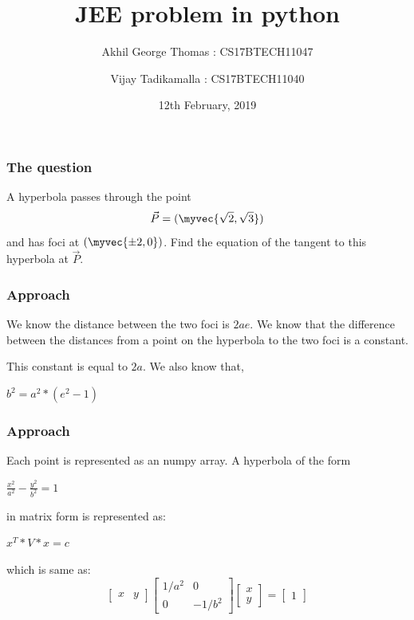 \documentclass{beamer}
\title{JEE problem in python}
\author{}{}
\author{
  Akhil George Thomas : CS17BTECH11047
  \and \newline
  Vijay Tadikamalla : CS17BTECH11040
}
\institute{IITH}
\date{12th February, 2019}
\begin{document}
 
\frame{\titlepage}
\begin{frame}
\frametitle{The question}
A hyperbola passes through the point 
\begin{equation}
\vec{P}=(\myvec{\sqrt{2}, \sqrt{3}})
\end{equation}
and has foci at $(\myvec{\pm 2, 0})$.  Find the equation of the tangent to this hyperbola at 
$\vec{P}$.
\end{frame}

\begin{frame}
\frametitle{Approach}
We know the distance between the two foci is $2ae$.
\pause
\bigbreak
We know that the difference between the distances from a point on the hyperbola to the two foci is a constant.
\pause
\bigbreak

This constant is equal to $2a$.
\pause
\bigbreak
We also know that, 

\centering
$b^2 = a^2*(e^2-1)$
\end{frame}
\begin{frame}
\frametitle{Approach}
Each point is represented as an numpy array.
\bigbreak
A hyperbola of the form

\begin{center}
$\frac{x^2}{a^2} - \frac{y^2}{b^2} = 1$ 
\end{center}

in matrix form is represented as:

\begin{center}
$ x^T * V * x = c$
\end{center}


which is same as:
\[
\begin{bmatrix}
    x & y
\end{bmatrix}
\begin{bmatrix}
    1/a^2  &  0      \\
    0  &  -1/b^2      
\end{bmatrix}
\begin{bmatrix}
    x       \\
    y
\end{bmatrix}
= 
\begin{bmatrix}
    1      
\end{bmatrix} 
\]
\end{frame}
\end{document}
